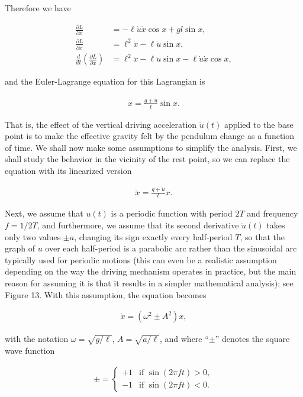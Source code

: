 \documentclass[11pt]{report}
\theoremstyle{plain}
\theoremstyle{definition}
\begin{document}
\noindent Therefore we have

\begin{align*}
\frac{\partial L}{\partial x} &= -\ell \dot{u}\dot{x}\cos x + gl\sin x,
\\
\frac{\partial L}{\partial \dot{x}} &= \ell^2 \dot{x} - \ell \dot{u}\sin x,
\\
\frac{d}{dt}\left(\frac{\partial L}{\partial \dot{x}}\right) &= \ell^2 \ddot{x} - \ell \ddot{u}\sin x - \ell \dot{u}\dot{x} \cos x,
\end{align*}

\noindent and the Euler-Lagrange equation for this Lagrangian is

\begin{align*}
\ddot{x} =\frac{g+\ddot{u}}{\ell} \sin x.
\end{align*}

\noindent That is, the effect of the vertical driving
acceleration $\ddot{u}(t)$ applied to the base point
is to make the effective gravity felt by the pendulum
change as a function of time. We shall now make some
assumptions to simplify the analysis. First, we shall
study the behavior in the vicinity of the rest point,
so we can replace the equation with its linearized
version

\begin{align*}
\ddot{x} = \frac{g+\ddot{u}}{\ell} x.
\end{align*}

\noindent Next, we assume that $u(t)$ is a periodic function
with period $2T$ and frequency $f = 1/2T$, and
furthermore, we assume that its second derivative
$\ddot{u}(t)$ takes only two values $\pm a$, changing
its sign exactly every half-period $T$, so that the
graph of $u$ over each half-period is a parabolic arc
rather than the sinusoidal arc typically used for
periodic motions (this can even be a realistic
assumption depending on the way the driving mechanism
operates in practice, but the main reason for assuming
it is that it results in a simpler mathematical
analysis); see Figure 13. With this assumption, the
equation becomes

\begin{align*}
\ddot{x} = (\omega^2 \pm A^2) x,
\end{align*}

\noindent with the notation $\omega=\sqrt{g/\ell}$,
$A=\sqrt{a/\ell}$, and where ``$\pm$'' denotes the
square wave function

\begin{align*}
\pm = \begin{cases} +1 & \textrm{if }\sin(2\pi f t)>0, \\ -1 &
\textrm{if }\sin(2\pi f t)<0.
\end{cases}
\end{align*}
\end{document}
